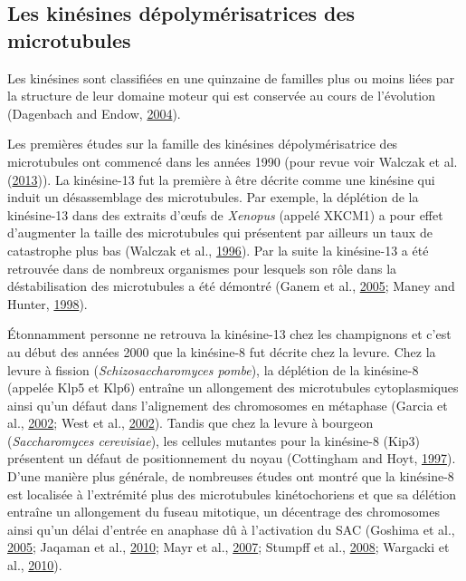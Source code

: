 \documentclass[12pt,a4paper,twoside,openright]{book}
\begin{document}
\subsection{Les kinésines dépolymérisatrices des
microtubules}\label{les-kinuxe9sines-duxe9polymuxe9risatrices-des-microtubules}

Les kinésines sont classifiées en une quinzaine de familles plus ou
moins liées par la structure de leur domaine moteur qui est conservée au
cours de l'évolution (Dagenbach and Endow,
\protect\hyperlink{ref-Dagenbach2004}{2004}).

Les premières études sur la famille des kinésines dépolymérisatrice des
microtubules ont commencé dans les années 1990 (pour revue voir Walczak
et al. (\protect\hyperlink{ref-Walczak2013a}{2013})). La kinésine-13 fut
la première à être décrite comme une kinésine qui induit un
désassemblage des microtubules. Par exemple, la déplétion de la
kinésine-13 dans des extraits d'œufs de \emph{Xenopus} (appelé XKCM1) a
pour effet d'augmenter la taille des microtubules qui présentent par
ailleurs un taux de catastrophe plus bas (Walczak et al.,
\protect\hyperlink{ref-Walczak1996}{1996}). Par la suite la kinésine-13
a été retrouvée dans de nombreux organismes pour lesquels son rôle dans
la déstabilisation des microtubules a été démontré (Ganem et al.,
\protect\hyperlink{ref-Ganem2005}{2005}; Maney and Hunter,
\protect\hyperlink{ref-Maney1998}{1998}).

Étonnamment personne ne retrouva la kinésine-13 chez les champignons et
c'est au début des années 2000 que la kinésine-8 fut décrite chez la
levure. Chez la levure à fission (\emph{Schizosaccharomyces pombe}), la
déplétion de la kinésine-8 (appelée Klp5 et Klp6) entraîne un
allongement des microtubules cytoplasmiques ainsi qu'un défaut dans
l'alignement des chromosomes en métaphase (Garcia et al.,
\protect\hyperlink{ref-Garcia2002d}{2002}; West et al.,
\protect\hyperlink{ref-West2002}{2002}). Tandis que chez la levure à
bourgeon (\emph{Saccharomyces cerevisiae}), les cellules mutantes pour
la kinésine-8 (Kip3) présentent un défaut de positionnement du noyau
(Cottingham and Hoyt, \protect\hyperlink{ref-Cottingham1997}{1997}).
D'une manière plus générale, de nombreuses études ont montré que la
kinésine-8 est localisée à l'extrémité plus des microtubules
kinétochoriens et que sa délétion entraîne un allongement du fuseau
mitotique, un décentrage des chromosomes ainsi qu'un délai d'entrée en
anaphase dû à l'activation du SAC (Goshima et al.,
\protect\hyperlink{ref-Goshima2005}{2005}; Jaqaman et al.,
\protect\hyperlink{ref-Jaqaman2010}{2010}; Mayr et al.,
\protect\hyperlink{ref-Mayr2007}{2007}; Stumpff et al.,
\protect\hyperlink{ref-Stumpff2008}{2008}; Wargacki et al.,
\protect\hyperlink{ref-Wargacki2010}{2010}).
\end{document}
